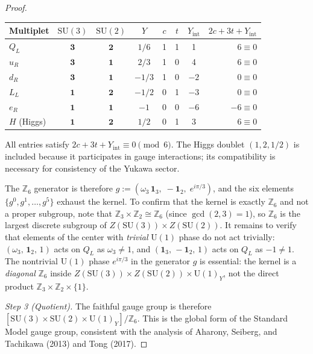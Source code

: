 \documentclass[11pt,a4paper]{article}
\theoremstyle{definition}
\newcommand{\SU}{\mathrm{SU}}
\newcommand{\U}{\mathrm{U}}
\begin{document}
\begin{proof}
\smallskip
\begin{center}\small
\renewcommand{\arraystretch}{1.15}
\begin{tabular}{@{}lccccccr@{}}
\toprule
\textbf{Multiplet} & $\SU(3)$ & $\SU(2)$ & $Y$ &
  $c$ & $t$ & $Y_{\mathrm{int}}$ &
  $2c{+}3t{+}Y_{\mathrm{int}}$ \\
\midrule
$Q_L$ & $\mathbf{3}$ & $\mathbf{2}$ & $1/6$ & 1 & 1 & 1 & $6 \equiv 0$ \\
$u_R$ & $\mathbf{3}$ & $\mathbf{1}$ & $2/3$ & 1 & 0 & 4 & $6 \equiv 0$ \\
$d_R$ & $\mathbf{3}$ & $\mathbf{1}$ & $-1/3$ & 1 & 0 & $-2$ & $0 \equiv 0$ \\
$L_L$ & $\mathbf{1}$ & $\mathbf{2}$ & $-1/2$ & 0 & 1 & $-3$ & $0 \equiv 0$ \\
$e_R$ & $\mathbf{1}$ & $\mathbf{1}$ & $-1$ & 0 & 0 & $-6$ & $-6 \equiv 0$ \\
\midrule
$H$ (Higgs) & $\mathbf{1}$ & $\mathbf{2}$ & $1/2$ & 0 & 1 & 3 & $6 \equiv 0$ \\
\bottomrule
\end{tabular}
\end{center}

\smallskip\noindent All entries satisfy
$2c + 3t + Y_{\mathrm{int}} \equiv 0 \pmod{6}$.  The Higgs doublet
$(1, 2, 1/2)$ is included because it participates in gauge
interactions; its compatibility is necessary for consistency of the
Yukawa sector.

The $\mathbb{Z}_6$ generator is therefore
$g := (\omega_3\,\mathbf{1}_3,\; -\mathbf{1}_2,\;
e^{i\pi/3})$, and the six elements $\{g^0, g^1, \ldots, g^5\}$
exhaust the kernel.  To confirm that the kernel is exactly
$\mathbb{Z}_6$ and not a proper subgroup, note that
$\mathbb{Z}_3 \times \mathbb{Z}_2 \cong \mathbb{Z}_6$ (since
$\gcd(2,3) = 1$), so $\mathbb{Z}_6$ is the largest discrete
subgroup of $Z(\SU(3)) \times Z(\SU(2))$.  It remains to verify that
elements of the center with \emph{trivial} $\U(1)$ phase do not
act trivially: $(\omega_3,\, \mathbf{1}_2,\, 1)$ acts on $Q_L$ as
$\omega_3 \ne 1$, and $(\mathbf{1}_3,\, -\mathbf{1}_2,\, 1)$ acts
on $Q_L$ as $-1 \ne 1$.  The nontrivial $\U(1)$ phase
$e^{i\pi/3}$ in the generator $g$ is essential: the kernel is a
\emph{diagonal} $\mathbb{Z}_6$ inside
$Z(\SU(3)) \times Z(\SU(2)) \times \U(1)_Y$, not the direct
product $\mathbb{Z}_3 \times \mathbb{Z}_2 \times \{1\}$.

\textit{Step 3 (Quotient).}\quad
The faithful gauge group is therefore
$[\SU(3) \times \SU(2) \times \U(1)_Y] / \mathbb{Z}_6$.  This is
the global form of the Standard Model gauge group, consistent with the
analysis of Aharony, Seiberg, and Tachikawa (2013) and
Tong (2017).
\end{proof}
\end{document}
